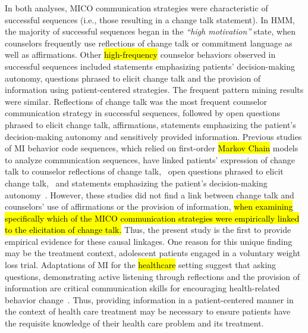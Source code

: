 \documentclass[smallextended]{svjour3}       %
\begin{document}
In both analyses, MICO communication strategies were characteristic of successful sequences (i.e., those resulting in a change talk statement). In HMM, the majority of successful sequences began in the \textit{``high motivation''} state, when counselors frequently use reflections of change talk or commitment language as well as affirmations. Other \hl{high-frequency} counselor behaviors observed in successful sequences included statements emphasizing patients' decision-making autonomy, questions phrased to elicit change talk and the provision of information using patient-centered strategies. The frequent pattern mining results were similar. Reflections of change talk was the most frequent counselor communication strategy in successful sequences, followed by open questions phrased to elicit change talk, affirmations, statements emphasizing the patient's decision-making autonomy and sensitively provided information. Previous studies of MI behavior code sequences, which relied on first-order \hl{Markov Chain} models to analyze communication sequences, have linked patients' expression of change talk to counselor reflections of change talk,~\cite{moyers2009session, gaume2010counselor, glynn2014change, carcone2013provider, jacques2016building} open questions phrased to elicit change talk,~\cite{moyers2009session, carcone2013provider, jacques2016building} and statements emphasizing the patient's decision-making autonomy~\cite{carcone2013provider, jacques2016building}. However, these studies did not find a link between change talk and counselors' use of affirmations or the provision of information, \hl{when examining specifically which of the MICO communication strategies were empirically linked to the elicitation of change talk.} Thus, the present study is the first to provide empirical evidence for these causal linkages. One reason for this unique finding may be the treatment context, adolescent patients engaged in a voluntary weight loss trial. Adaptations of MI for the \hl{healthcare} setting suggest that asking questions, demonstrating active listening through reflections and the provision of information are critical communication skills for encouraging health-related behavior change~\cite{douaihy2015motivational}. Thus, providing information in a patient-centered manner in the context of health care treatment may be necessary to ensure patients have the requisite knowledge of their health care problem and its treatment. 
\end{document}

